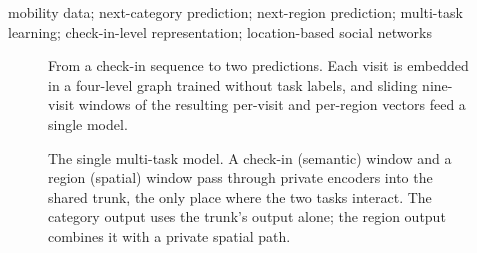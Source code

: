 \documentclass[conference]{IEEEtran}
\begin{document}
\begin{IEEEkeywords}
mobility data; next-category prediction; next-region prediction; multi-task
learning; check-in-level representation; location-based social networks
\end{IEEEkeywords}




\begin{figure}[!t]\centering
\resizebox{\textwidth}{!}{}
\caption{From a check-in sequence to two predictions. Each visit is embedded in a four-level graph
trained without task labels, and sliding nine-visit windows of the resulting per-visit and per-region
vectors feed a single model.}
\label{fig:dataflow}
\end{figure}     %



\begin{figure}[!t]\centering
\resizebox{\columnwidth}{!}{}
\caption{The single multi-task model. A check-in (semantic) window and a region (spatial) window
pass through private encoders into the shared trunk, the only place where the two tasks
interact. The category output uses the trunk's output alone; the region output
combines it with a private spatial path.}
\label{fig:model}
\end{figure}        %




\end{document}
